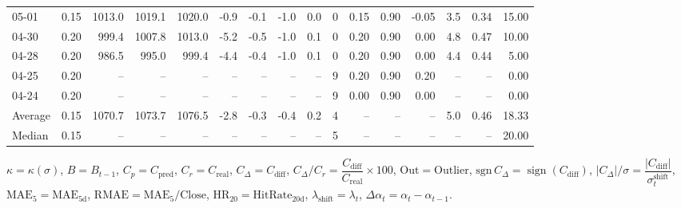 \begin{threeparttable}
{\begin{tabular}{lrrrrrrrrrrrrrrr}
  05-01 &     0.15 & 1013.0 & 1019.1 & 1020.0 &       -0.9 &           -0.1 &                     -1.0 &                 0.0 &              0 &       0.15 &      0.90 &          -0.05 &              3.5 &            0.34 &                  15.00 \\
  04-30 &     0.20 &  999.4 & 1007.8 & 1013.0 &       -5.2 &           -0.5 &                     -1.0 &                 0.1 &              0 &       0.20 &      0.90 &           0.00 &              4.8 &            0.47 &                  10.00 \\
  04-28 &     0.20 &  986.5 &  995.0 &  999.4 &       -4.4 &           -0.4 &                     -1.0 &                 0.1 &              0 &       0.20 &      0.90 &           0.00 &              4.4 &            0.44 &                   5.00 \\
  04-25 &     0.20 &     -- &     -- &     -- &         -- &             -- &                       -- &                  -- &              9 &       0.20 &      0.90 &           0.20 &               -- &              -- &                   0.00 \\
  04-24 &     0.20 &     -- &     -- &     -- &         -- &             -- &                       -- &                  -- &              9 &       0.00 &      0.90 &           0.00 &               -- &              -- &                   0.00 \\
Average &     0.15 & 1070.7 & 1073.7 & 1076.5 &       -2.8 &           -0.3 &                     -0.4 &                 0.2 &              4 &         -- &        -- &             -- &              5.0 &            0.46 &                  18.33 \\
 Median &     0.15 &     -- &     -- &     -- &         -- &             -- &                       -- &                  -- &              5 &         -- &        -- &             -- &               -- &              -- &                  20.00 \\
\bottomrule
\end{tabular}
}
\begin{tablenotes}\footnotesize
\item $\kappa=\kappa(\sigma)$, $B=B_{t-1}$, $C_p=C_{\text{pred}}$, $C_r=C_{\text{real}}$, $C_\Delta=C_{\text{diff}}$, $C_\Delta/C_r=\dfrac{C_{\text{diff}}}{C_{\text{real}}}\times100$, $\mathrm{Out}=\text{Outlier}$, $\mathrm{sgn}\,C_\Delta=\operatorname{sign}(C_{\text{diff}})$, $|C_\Delta|/\sigma=\dfrac{|C_{\text{diff}}|}{\sigma_t^{\text{shift}}}$, $\mathrm{MAE}_5=\mathrm{MAE}_{5\text{d}}$, $\mathrm{RMAE}= \mathrm{MAE}_5 / \text{Close}$, $\mathrm{HR}_{20}=\mathrm{HitRate}_{20\text{d}}$, 
$\lambda_{\text{shift}}=\lambda_t$, 
$\Delta\alpha_t=\alpha_t-\alpha_{t-1}$.
\end{tablenotes}
\end{threeparttable}
\endgroup

